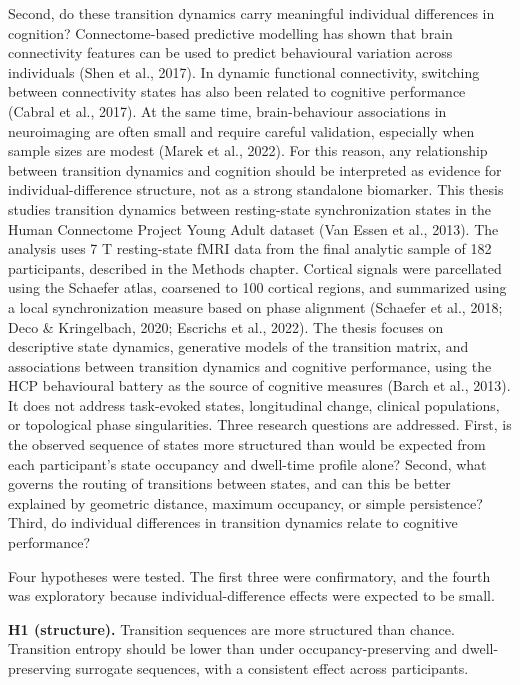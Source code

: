 \documentclass[12pt,a4paper]{report}
\begin{document}
Second, do these transition dynamics carry meaningful individual differences in cognition? Connectome-based predictive modelling has shown that brain connectivity features can be used to predict behavioural variation across individuals (Shen et al., 2017). In dynamic functional connectivity, switching between connectivity states has also been related to cognitive performance (Cabral et al., 2017). At the same time, brain-behaviour associations in neuroimaging are often small and require careful validation, especially when sample sizes are modest (Marek et al., 2022). For this reason, any relationship between transition dynamics and cognition should be interpreted as evidence for individual-difference structure, not as a strong standalone biomarker. This thesis studies transition dynamics between resting-state synchronization states in the Human Connectome Project Young Adult dataset (Van Essen et al., 2013). The analysis uses 7 T resting-state fMRI data from the final analytic sample of 182 participants, described in the Methods chapter. Cortical signals were parcellated using the Schaefer atlas, coarsened to 100 cortical regions, and summarized using a local synchronization measure based on phase alignment (Schaefer et al., 2018; Deco \& Kringelbach, 2020; Escrichs et al., 2022). The thesis focuses on descriptive state dynamics, generative models of the transition matrix, and associations between transition dynamics and cognitive performance, using the HCP behavioural battery as the source of cognitive measures (Barch et al., 2013). It does not address task-evoked states, longitudinal change, clinical populations, or topological phase singularities. Three research questions are addressed. First, is the observed sequence of states more structured than would be expected from each participant's state occupancy and dwell-time profile alone? Second, what governs the routing of transitions between states, and can this be better explained by geometric distance, maximum occupancy, or simple persistence? Third, do individual differences in transition dynamics relate to cognitive performance?

Four hypotheses were tested. The first three were confirmatory, and the fourth was exploratory because individual-difference effects were expected to be small.

\textbf{H1 (structure).} Transition sequences are more structured than chance. Transition entropy should be lower than under occupancy-preserving and dwell-preserving surrogate sequences, with a consistent effect across participants.
\end{document}
